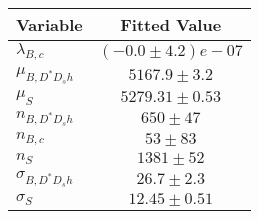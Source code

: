 \begin{tabular}[t]{lc}
\hline
Variable &Fitted Value\\
\hline\hline
$\lambda_{B,c}$&$(-0.0\pm4.2)e-07$\\
\hline
$\mu_{B, D^* D_s h}$&$5167.9\pm3.2$\\
\hline
$\mu_S$&$5279.31\pm0.53$\\
\hline
$n_{B, D^* D_s h}$&$650\pm47$\\
\hline
$n_{B,c}$&$53\pm83$\\
\hline
$n_S$&$1381\pm52$\\
\hline
$\sigma_{B, D^* D_s h}$&$26.7\pm2.3$\\
\hline
$\sigma_S$&$12.45\pm0.51$\\
\hline
\end{tabular}